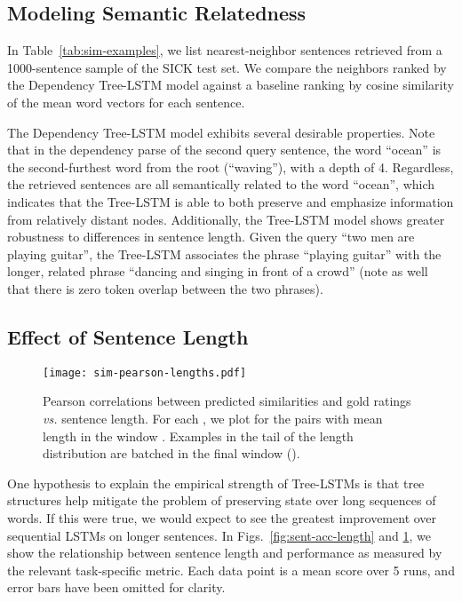 \documentclass[11pt]{article}
\begin{document}
\subsection{Modeling Semantic Relatedness}

In Table~\ref{tab:sim-examples}, we list nearest-neighbor sentences retrieved from a 1000-sentence sample of the SICK test set. We compare the neighbors ranked by the Dependency Tree-LSTM model against a baseline ranking by cosine similarity of the mean word vectors for each sentence.

The Dependency Tree-LSTM model exhibits several desirable properties. Note that in the dependency parse of the second query sentence, the word ``ocean'' is the second-furthest word from the root (``waving''), with a depth of 4. Regardless, the retrieved sentences are all semantically related to the word ``ocean'', which indicates that the Tree-LSTM is able to both preserve and emphasize information from relatively distant nodes. Additionally, the Tree-LSTM model shows greater robustness to differences in sentence length. Given the query ``two men are playing guitar'', the Tree-LSTM associates the phrase ``playing guitar'' with the longer, related phrase ``dancing and singing in front of a crowd'' (note as well that there is zero token overlap between the two phrases).

\subsection{Effect of Sentence Length}

\begin{figure}[t]
\centering
\texttt{[image: sim-pearson-lengths.pdf]}
\caption{Pearson correlations  between predicted similarities and gold ratings \emph{vs.} sentence length. For each , we plot  for the pairs with mean length in the window . Examples in the tail of the length distribution are batched in the final window ().}
\label{fig:sim-pearson-length}
\end{figure}

One hypothesis to explain the empirical strength of Tree-LSTMs is that tree structures help mitigate the problem of preserving state over long sequences of words. If this were true, we would expect to see the greatest improvement over sequential LSTMs on longer sentences. In Figs.~\ref{fig:sent-acc-length} and \ref{fig:sim-pearson-length}, we show the relationship between sentence length and performance as measured by the relevant task-specific metric. Each data point is a mean score over 5 runs, and error bars have been omitted for clarity.
\end{document}
